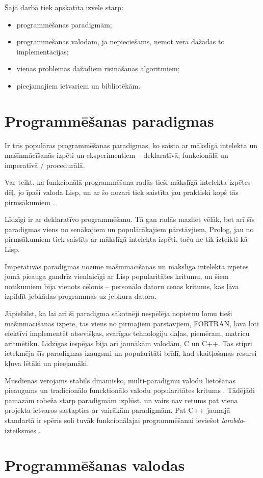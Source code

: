 \documentclass{ludis}
\begin{document}
Šajā darbā tiek apskatīta izvēle starp:
\begin{itemize}
\item programmēšanas paradigmām;
\item programmēšanas valodām, ja nepieciešams, ņemot vērā dažādas to implementācijas;
\item vienas problēmas dažādiem risināšanas algoritmiem;
\item pieejamajiem ietvariem un bibliotēkām.
\end{itemize}

\section{Programmēšanas paradigmas}
Ir trīs populāras programmēšanas paradigmas, ko saista ar mākslīgā intelekta un mašīnmācīšanās izpēti un eksperimentiem -- deklaratīvā, funkcionālā un imperatīvā / procedurālā. 

Var teikt, ka funkcionālā programmēšana radās tieši mākslīgā intelekta izpētes dēļ, jo īpaši valoda Lisp, un ar šo nozari tiek saistīta jau praktiski kopš tās pirmsākumiem \cite{hist_lisp}. 

Līdzīgi ir ar deklaratīvo programmēšanu. Tā gan radās mazliet vēlāk, bet arī šīs paradigmas viens no senākajiem un populārākajiem pārstāvjiem, Prolog, jau no pirmsākumiem tiek saistīts ar mākslīgā intelekta izpēti, taču ne tik izteikti kā Lisp.

Imperatīvās paradigmas nozīme mašīnmācīšanās un mākslīgā intelekta izpētes jomā pieauga gandrīz vienlaicīgi ar Lisp popularitātes kritumu, un šiem notikumiem bija vienots cēlonis -- personālo datoru cenas kritums, kas ļāva izpildīt jebkādas programmas uz jebkura datora. 

Jāpiebilst, ka lai arī šī paradigma sākotnēji nespēlēja nopietnu lomu tieši mašīnmācīšanās izpētē, tās viens no pirmajiem pārstāvjiem, FORTRAN, ļāva ļoti efektīvi implementēt atsevišķas, svarīgas tehnoloģiju daļas, piemēram, matricu aritmētiku. Līdzīgas iespējas bija arī jaunākām valodām, C un C++. Tas stipri ietekmēja šīs paradigmas izaugsmi un popularitāti brīdī, kad skaitļošanas resursi kļuva lētāki un pieejamāki.

Mūsdienās vērojams stabils dinamisko, multi-paradigmu valodu lietošanas pieaugums un tradicionālo funcktionālo valodu popularitātes kritums \cite{tiobe_index}. Tādējādi pamazām robeža starp paradigmām izplūst, un vairs nav retums pat viena projekta ietvaros sastapties ar vairākām paradigmām. Pat C++ jaunajā standartā ir spēris soli tuvāk funkcionālajai programmēšanai ieviešot {\em lambda}-izteiksmes \cite{iso_cpp11}.

\section{Programmēšanas valodas}



\end{document}

